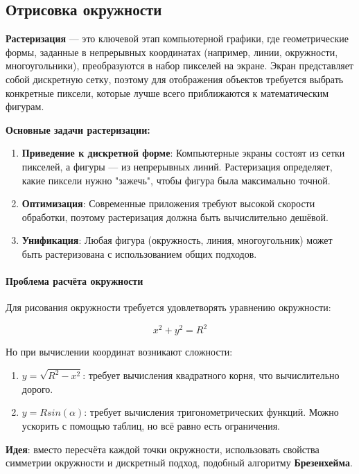 
\subsection{Отрисовка окружности}

\textbf{Растеризация} — это ключевой этап компьютерной графики, где геометрические формы, заданные в непрерывных координатах (например, линии, окружности, многоугольники), преобразуются в набор пикселей на экране. Экран представляет собой дискретную сетку, поэтому для отображения объектов требуется выбрать конкретные пиксели, которые лучше всего приближаются к математическим фигурам.

\textbf{Основные задачи растеризации:}
\begin{enumerate}
    \item \textbf{Приведение к дискретной форме}: Компьютерные экраны состоят из сетки пикселей, а фигуры — из непрерывных линий. Растеризация определяет, какие пиксели нужно "зажечь", чтобы фигура была максимально точной.
    \item \textbf{Оптимизация}: Современные приложения требуют высокой скорости обработки, поэтому растеризация должна быть вычислительно дешёвой.
    \item \textbf{Унификация}: Любая фигура (окружность, линия, многоугольник) может быть растеризована с использованием общих подходов.
\end{enumerate}

\paragraph*{Проблема расчёта окружности}
Для рисования окружности требуется удовлетворять уравнению окружности:

\[
    x^2 + y^2 = R^2
\]

Но при вычислении координат возникают сложности:

\begin{enumerate}
    \item $y = \sqrt{R^2-x^2}$: требует вычисления квадратного корня, что вычислительно дорого.
    \item $y = R sin(\alpha)$: требует вычисления тригонометрических функций. Можно ускорить с помощью таблиц, но всё равно есть ограничения.
\end{enumerate}

\textbf{Идея}: вместо пересчёта каждой точки окружности, использовать свойства симметрии окружности и дискретный подход, подобный алгоритму \textbf{Брезенхейма}.

